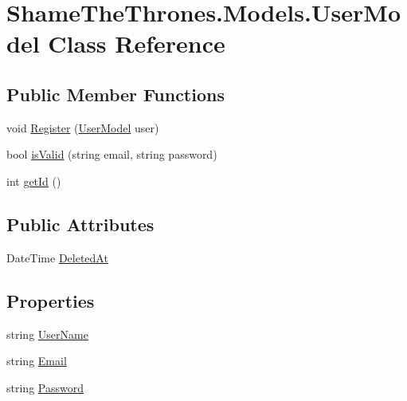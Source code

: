 \hypertarget{class_shame_the_thrones_1_1_models_1_1_user_model}{}\section{Shame\+The\+Thrones.\+Models.\+User\+Model Class Reference}
\label{class_shame_the_thrones_1_1_models_1_1_user_model}
\subsection*{Public Member Functions}
\begin{DoxyCompactItemize}
\item 
void \hyperlink{class_shame_the_thrones_1_1_models_1_1_user_model_a69c4613c9f41b68bde65d5ef6bef8ee6}{Register} (\hyperlink{class_shame_the_thrones_1_1_models_1_1_user_model}{User\+Model} user)
\item 
bool \hyperlink{class_shame_the_thrones_1_1_models_1_1_user_model_a24298cda167d9fb994b04aa1463aec75}{is\+Valid} (string email, string password)
\item 
int \hyperlink{class_shame_the_thrones_1_1_models_1_1_user_model_a95374caaf43539a930252bfa44ee9ef1}{get\+Id} ()
\end{DoxyCompactItemize}
\subsection*{Public Attributes}
\begin{DoxyCompactItemize}
\item 
Date\+Time \hyperlink{class_shame_the_thrones_1_1_models_1_1_user_model_a09f7a76a9ac01642452de36d295ccff1}{Deleted\+At}
\end{DoxyCompactItemize}
\subsection*{Properties}
\begin{DoxyCompactItemize}
\item 
string \hyperlink{class_shame_the_thrones_1_1_models_1_1_user_model_a666db1c87db096237e789ee3251deb41}{User\+Name}
\item 
string \hyperlink{class_shame_the_thrones_1_1_models_1_1_user_model_ae917e1ddb972da8639c50feff9193ec9}{Email}
\item 
string \hyperlink{class_shame_the_thrones_1_1_models_1_1_user_model_a1a3dbf56bfeb4a94407379aacc420a30}{Password}
\end{DoxyCompactItemize}


